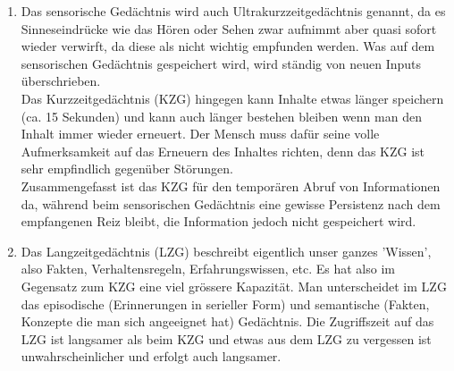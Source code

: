 
\begin{enumerate}[label=\alph*)]

    \item Das sensorische Gedächtnis wird auch Ultrakurzzeitgedächtnis genannt, da es Sinneseindrücke wie
das Hören oder Sehen zwar aufnimmt aber quasi sofort wieder verwirft, da diese als nicht
wichtig empfunden werden. Was auf dem sensorischen Gedächtnis gespeichert wird, wird 
ständig von neuen Inputs überschrieben. \\
    Das Kurzzeitgedächtnis (KZG) hingegen kann Inhalte etwas länger speichern (ca. 15 Sekunden) und kann auch
länger bestehen bleiben wenn man den Inhalt immer wieder erneuert. Der Mensch muss dafür
seine volle Aufmerksamkeit auf das Erneuern des Inhaltes richten, denn das KZG ist sehr empfindlich
gegenüber Störungen.  \\
Zusammengefasst ist das KZG für den temporären Abruf von Informationen da, 
während beim sensorischen Gedächtnis eine gewisse Persistenz nach dem empfangenen Reiz bleibt, 
die Information jedoch nicht gespeichert wird. 

    \item Das Langzeitgedächtnis (LZG) beschreibt eigentlich unser ganzes 'Wissen', also Fakten, Verhaltensregeln,
Erfahrungswissen, etc. Es hat also im Gegensatz zum KZG eine viel grössere
Kapazität. Man unterscheidet im LZG das episodische (Erinnerungen in serieller Form) und
semantische (Fakten, Konzepte die man sich angeeignet hat) Gedächtnis. Die Zugriffszeit auf das LZG
ist langsamer als beim KZG und etwas aus dem LZG zu vergessen ist unwahrscheinlicher und erfolgt
auch langsamer.
    
\end{enumerate}

 
 


